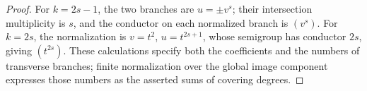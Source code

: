 \begin{proof}
For $k=2s-1$, the two branches are
$u=\pm v^s$; their intersection multiplicity
is $s$, and the conductor on each normalized
branch is $(v^s)$. For $k=2s$, the normalization
is $v=t^2$, $u=t^{2s+1}$, whose semigroup
has conductor $2s$, giving $(t^{2s})$.
These calculations specify both the coefficients
and the numbers of transverse branches; finite
normalization over the global image component
expresses those numbers as the asserted sums
of covering degrees.
\end{proof}


